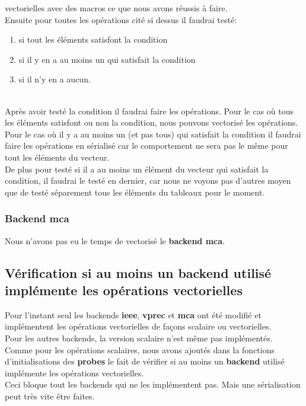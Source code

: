 \documentclass[11pt]{article}
\begin{document}
vectorielles avec des macros ce que nous avons réussis à faire.
\\ \vspace{5mm}
Ensuite pour toutes les opérations cité si dessus il faudrai testé:
\begin{enumerate}
\item si tout les éléments satisfont la condition
\item si il y en a au moins un qui satisfait la condition
\item si il n'y en a aucun.
\end{enumerate}
\\ \vspace{5mm}
Après avoir testé la condition il faudrai faire les opérations. Pour le cas
où tous les éléments satisfont ou non la condition, nous pouvons vectorisé
les opérations. Pour le cas où il y a au moins un (et pas tous) qui
satisfait la condition il faudrai faire les opérations en sérialisé car le
comportement ne sera pas le même pour tout les éléments du vecteur.
\\ \vspace{5mm}
De plus pour testé si il a au moins un élément du vecteur qui satisfait la
condition, il faudrai le testé en dernier, car nous ne voyons pas d'autres
moyen que de testé séparement tous les éléments du tableaux pour le moment.

\subsubsection{Backend mca}
\label{sec:org2146b71}

Nous n'avons pas eu le temps de vectorisé le \textbf{backend mca}.

\subsection{Vérification si au moins un backend utilisé implémente les opérations vectorielles}
\label{sec:orgc5bc772}

Pour l'instant seul les backends \textbf{ieee}, \textbf{vprec} et \textbf{mca} ont été
modifié et implémentent les opérations vectorielles de façons
scalaire ou vectorielles.
\\ \vspace{5mm}
Pour les autres backends, la version scalaire n'est même pas
implémentés.
\\ \vspace{5mm}
Comme pour les opérations scalaires, nous avons ajoutés dans la
fonctions d'initialisations des \textbf{probes} le fait de vérifier si au
moins un \textbf{backend} utilisé implémente les opérations vectorielles.
\\ \vspace{5mm}
Ceci bloque tout les backends qui ne les implémentent pas. Mais une
sérialisation peut très vite être faites.
\end{document}
